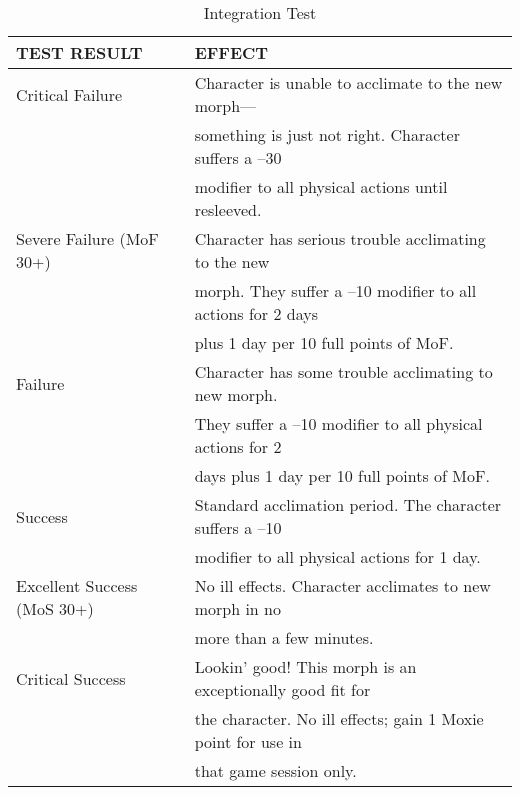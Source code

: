 \begin{table} \caption{Integration Test} \begin{tabular}{|l|l|} 



\hline

TEST RESULT &EFFECT\\ \hline

Critical Failure &Character is unable to acclimate to the new morph—\\ &something is just not right. Character suffers a –30\\ &modifier to all physical actions until resleeved. \\ \hline

Severe Failure (MoF 30+) &Character has serious trouble acclimating to the new \\ &morph. They suffer a –10 modifier to all actions for 2 days \\ &plus 1 day per 10 full points of MoF. \\ \hline

Failure &Character has some trouble acclimating to new morph. \\ &They suffer a –10 modifier to all physical actions for 2 \\ &days plus 1 day per 10 full points of MoF. \\ \hline

Success &Standard acclimation period. The character suffers a –10 \\ &modifier to all physical actions for 1 day. \\ \hline

Excellent Success (MoS 30+) &No ill effects. Character acclimates to new morph in no \\ &more than a few minutes. \\ \hline

Critical Success &Lookin’ good! This morph is an exceptionally good fit for \\ &the character. No ill effects; gain 1 Moxie point for use in \\ &that game session only. \\ \hline

\end{tabular} \end{table} 


